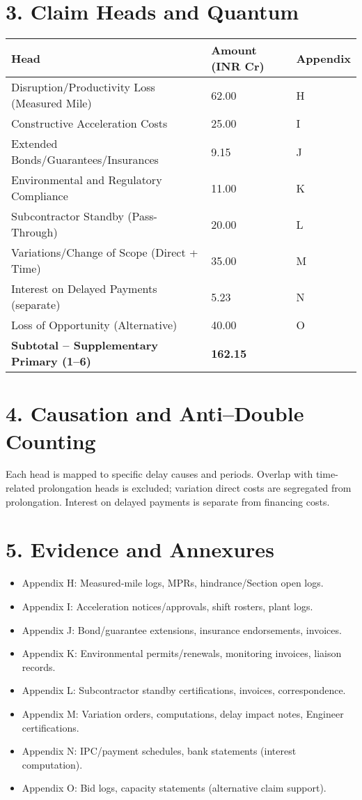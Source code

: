 \documentclass[12pt,letterpaper]{article}
\begin{document}
\section*{3. Claim Heads and Quantum}
\begin{longtable}{p{}p{}p{}}
\textbf{Head} & \textbf{Amount (INR Cr)} & \textbf{Appendix} \\
\hline
Disruption/Productivity Loss (Measured Mile) & 62.00 & H \\
Constructive Acceleration Costs & 25.00 & I \\
Extended Bonds/Guarantees/Insurances & 9.15 & J \\
Environmental and Regulatory Compliance & 11.00 & K \\
Subcontractor Standby (Pass-Through) & 20.00 & L \\
Variations/Change of Scope (Direct + Time) & 35.00 & M \\
Interest on Delayed Payments (separate) & 5.23 & N \\
Loss of Opportunity (Alternative) & 40.00 & O \\
\textbf{Subtotal – Supplementary Primary (1–6)} & \textbf{162.15} & \\
\end{longtable}

\section*{4. Causation and Anti–Double Counting}
Each head is mapped to specific delay causes and periods. Overlap with time-related prolongation heads is excluded; variation direct costs are segregated from prolongation. Interest on delayed payments is separate from financing costs.

\section*{5. Evidence and Annexures}
\begin{itemize}
  \item Appendix H: Measured-mile logs, MPRs, hindrance/Section open logs.
  \item Appendix I: Acceleration notices/approvals, shift rosters, plant logs.
  \item Appendix J: Bond/guarantee extensions, insurance endorsements, invoices.
  \item Appendix K: Environmental permits/renewals, monitoring invoices, liaison records.
  \item Appendix L: Subcontractor standby certifications, invoices, correspondence.
  \item Appendix M: Variation orders, computations, delay impact notes, Engineer certifications.
  \item Appendix N: IPC/payment schedules, bank statements (interest computation).
  \item Appendix O: Bid logs, capacity statements (alternative claim support).
\end{itemize}
\end{document}
